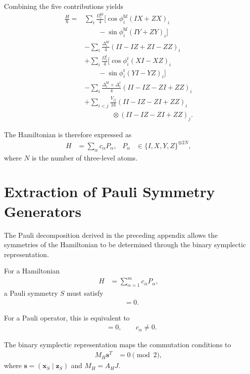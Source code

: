 \documentclass[amssymb,twocolumn,aps]{revtex4-2}
\begin{document}
Combining the five contributions yields
\begin{align*}
    \frac{H}{\hbar}
    ={}&
    \sum_i\frac{\Omega_i^{\mathrm{hf}}}{4}
    \Big[
        \cos\phi_i^{\mathrm{hf}}(IX+ZX)_i\\
    &\qquad
        -\sin\phi_i^{\mathrm{hf}}(IY+ZY)_i
    \Big]\\[4pt]
    &-\sum_i\frac{\Delta_i^{\mathrm{hf}}}{4}
      (II-IZ+ZI-ZZ)_i\\[4pt]
    &+\sum_i\frac{\Omega_i^{\mathrm{r}}}{4}
    \Big[
        \cos\phi_i^{\mathrm{r}}(XI-XZ)_i\\
    &\qquad
        -\sin\phi_i^{\mathrm{r}}(YI-YZ)_i
    \Big]\\[4pt]
    &-\sum_i
      \frac{\Delta_i^{\mathrm{hf}}+\Delta_i^{\mathrm{r}}}{4}
      (II-IZ-ZI+ZZ)_i\\[4pt]
    &+\sum_{i<j}\frac{V_{ij}}{16}
      (II-IZ-ZI+ZZ)_i\\
    &\qquad\qquad\otimes
      (II-IZ-ZI+ZZ)_j.
\end{align*}

The Hamiltonian is therefore expressed as
\begin{align*}
    H &= \sum_\alpha c_\alpha P_\alpha,
    &P_\alpha &\in \{I,X,Y,Z\}^{\otimes 2N},
\end{align*}
where $N$ is the number of three-level atoms.

\section{Extraction of Pauli Symmetry Generators}
\label{app:rydberg_symmetries}

The Pauli decomposition derived in the preceding
appendix allows the symmetries of the Hamiltonian
to be determined through the binary symplectic
representation.

For a Hamiltonian
\begin{align*}
    H &= \sum_{\alpha=1}^{m}c_\alpha P_\alpha,
\end{align*}
a Pauli symmetry $S$ must satisfy
\begin{align*}
    [S,H] &= 0.
\end{align*}

For a Pauli operator, this is equivalent to
\begin{align*}
    [S,P_\alpha] &= 0,
    \qquad c_\alpha\neq 0.
\end{align*}

The binary symplectic representation maps the
commutation conditions to
\begin{align*}
    M_H\mathbf{s}^{T} &= 0 \pmod 2,
\end{align*}
where $\mathbf{s}=(\mathbf{x}_S\mid\mathbf{z}_S)$
and $M_H=A_HJ$.
\end{document}
